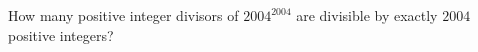 How many positive integer divisors of $2004^{2004}$ are divisible by exactly $2004$ positive integers?